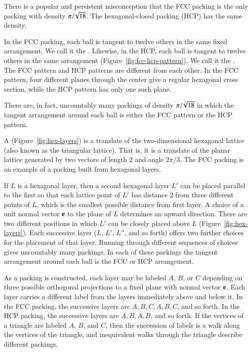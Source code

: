 There is a popular and persistent misconception that the FCC
 packing is the only packing with density $\pi/\!\sqrt{18}$.
The hexagonal-closed packing (HCP) has the same density.
%
%


In the FCC packing, each ball is tangent to twelve others in the same
fixed arrangement.  We call it the .  Likewise, in the HCP, each ball is tangent
to twelve others in the same arrangement
(Figure~\ref{fig:fcc-hcp-pattern}).  We call it the .  The FCC pattern and HCP patterns are
different from each other.  In the FCC pattern, four different planes
through the center give a regular hexagonal cross section, while the
HCP pattern has only one such plane.

\figSGIWBEN %

There are, in fact, uncountably many packings of density
$\pi/\!\sqrt{18}$ in which the tangent arrangement around each ball is
either the FCC pattern or the HCP pattern.

A  (Figure~\ref{fig:hex-layers}) is a translate of the
two-dimensional hexagonal lattice (also known as the triangular
lattice). That is, it is a translate of the planar lattice generated
by two vectors of length $2$ and angle $2\pi/3$.  The FCC
 packing is an example of a packing built from hexagonal layers.

 If $L$ is a hexagonal layer, then a second hexagonal layer $L'$ can be
 placed parallel to the first so that each lattice point of $L'$ has
 distance $2$ from three different points of $L$,
 which is the smallest possible distance from first layer.  A choice
 of a unit normal vector ${\mathbf e}$ to the plane of $L$ determines an upward
 direction.  There are two different positions in which $L'$ can be
 closely placed above $L$
(Figure~\ref{fig:hex-layers}).  Each successive layer 
  ($L$, $L'$, $L''$, and so
 forth) offers two further choices  for the placement of
 that layer. Running through different 
 sequences of choices gives uncountably many packings.  In each of
 these packings the tangent arrangement around each ball is the FCC or HCP arrangement.

\figCCQCYWU %

As a packing is constructed, each layer may be labeled
$A$, $B$, or $C$ depending on three possible orthogonal projections to a fixed plane
with normal vector ${\mathbf e}$.
Each layer carries a different label from the layers immediately
above and below it.  In the FCC packing, the successive layers are
$A,B,C,A,B,C$, and so forth.  In the HCP packing, the successive layers are
$A,B,A,B$, and so forth.  If the vertices of a triangle are labeled $A$, $B$, and $C$,
then the succession of labels is a
walk along the vertices of the triangle, and inequivalent walks through the
triangle describe different packings.



